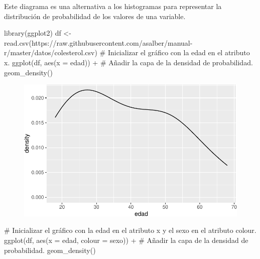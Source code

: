 \documentclass[
  a4paper,
]{scrreport}
\newenvironment{Shaded}{\begin{snugshade}}{\end{snugshade}}
\newcommand{\AttributeTok}[1]{\textcolor[rgb]{0.40,0.45,0.13}{#1}}
\newcommand{\CommentTok}[1]{\textcolor[rgb]{0.37,0.37,0.37}{#1}}
\newcommand{\FunctionTok}[1]{\textcolor[rgb]{0.28,0.35,0.67}{#1}}
\newcommand{\NormalTok}[1]{\textcolor[rgb]{0.00,0.23,0.31}{#1}}
\newcommand{\OtherTok}[1]{\textcolor[rgb]{0.00,0.23,0.31}{#1}}
\newcommand{\SpecialCharTok}[1]{\textcolor[rgb]{0.37,0.37,0.37}{#1}}
\newcommand{\StringTok}[1]{\textcolor[rgb]{0.13,0.47,0.30}{#1}}
\theoremstyle{definition}
\theoremstyle{definition}
\theoremstyle{remark}
\begin{document}
Este diagrama es una alternativa a los histogramas para representar la
distribución de probabilidad de los valores de una variable.

\begin{Shaded}
\begin{Highlighting}[]
\FunctionTok{library}\NormalTok{(ggplot2)}
\NormalTok{df }\OtherTok{\textless{}{-}} \FunctionTok{read.csv}\NormalTok{(}\StringTok{\textquotesingle{}https://raw.githubusercontent.com/asalber/manual{-}r/master/datos/colesterol.csv\textquotesingle{}}\NormalTok{)}
\CommentTok{\# Inicializar el gráfico con la edad en el atributo x.}
\FunctionTok{ggplot}\NormalTok{(df, }\FunctionTok{aes}\NormalTok{(}\AttributeTok{x =}\NormalTok{ edad)) }\SpecialCharTok{+}
\CommentTok{\# Añadir la capa de la densidad de probabilidad.}
    \FunctionTok{geom\_density}\NormalTok{()}
\end{Highlighting}
\end{Shaded}

\begin{figure}[H]

{\centering \includegraphics{07-graficos_files/figure-pdf/unnamed-chunk-19-1.pdf}

}

\end{figure}

\begin{Shaded}
\begin{Highlighting}[]
\CommentTok{\# Inicializar el gráfico con la edad en el atributo x y el sexo en el atributo colour.}
\FunctionTok{ggplot}\NormalTok{(df, }\FunctionTok{aes}\NormalTok{(}\AttributeTok{x =}\NormalTok{ edad, }\AttributeTok{colour =}\NormalTok{ sexo)) }\SpecialCharTok{+}
\CommentTok{\# Añadir la capa de la densidad de probabilidad.}
    \FunctionTok{geom\_density}\NormalTok{()}
\end{Highlighting}
\end{Shaded}
\end{document}
